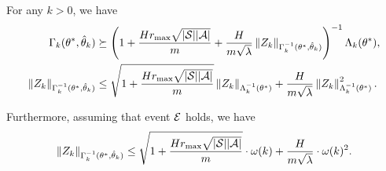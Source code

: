 \begin{lemma} \label{lemma:eff_bound_Z_k}
	For any $k>0$, we have
	\begin{align*}
		\Gamma_k(\theta^*,\hat{\theta}_k) &\succeq \left(  1+  \frac{H r_{\max} \sqrt{|\mathcal{S}| |\mathcal{A}|}}{m}   + \frac{H}{m\sqrt{\lambda}} \left\|  Z_k  \right\|_{\Gamma_k^{-1}(\theta^*,\hat{\theta}_k)}  \right)^{-1} \Lambda_k(\theta^*) ,
		\\
		\left\| Z_k \right\|_{\Gamma_k^{-1}(\theta^*,\hat{\theta}_k)} &\leq \sqrt{ 1+  \frac{H r_{\max} \sqrt{|\mathcal{S}| |\mathcal{A}|}}{m} } \left\| Z_k \right\|_{\Lambda_k^{-1}(\theta^*)} + \frac{H}{m\sqrt{\lambda}}  \left\| Z_k \right\|_{\Lambda_k^{-1}(\theta^*)}^2 .
	\end{align*}
	
	Furthermore, assuming that event $\mathcal{E}$ holds, we have
	\begin{align*}
		\left\| Z_k \right\|_{\Gamma_k^{-1}(\theta^*,\hat{\theta}_k)} \leq \sqrt{ 1+  \frac{H r_{\max} \sqrt{|\mathcal{S}| |\mathcal{A}|}}{m} } \cdot \omega(k) + \frac{H}{m\sqrt{\lambda}} \cdot \omega(k)^2 .
	\end{align*}
\end{lemma}

